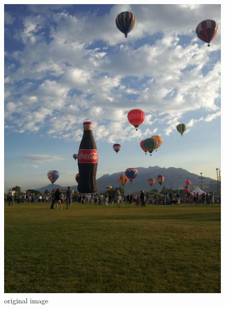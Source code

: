 \newpage
\vfill
\begin{figure}[ht]
\begin{minipage}[b]{0.45\linewidth}
\centering
\includegraphics[width=\textwidth]{baloon_resized_color.jpg}
\caption*{original image}
\end{minipage}
\hspace{0.5cm}
\begin{minipage}[b]{0.45\linewidth}
\centering

\end{minipage}
\end{figure}
